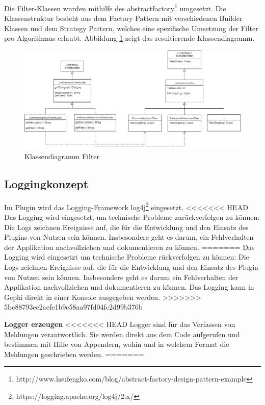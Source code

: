 Die Filter-Klassen wurden mithilfe des \acs{abstractfactory}\footnote{http://www.hsufengko.com/blog/abstract-factory-design-pattern-example} umgesetzt. Die Klassenstruktur besteht aus dem Factory Pattern mit verschiedenen Builder Klassen und dem Strategy Pattern, welches eine spezifische Umsetzung der Filter pro Algorithmus erlaubt. Abbildung \ref{fig:class_filter} zeigt das resultierende Klassendiagramm.
\begin{figure}
    \centering
    \includegraphics[width=\linewidth]{resources/class_Filter.png}
    \caption{Klassendiagramm Filter}
    \label{fig:class_filter}
\end{figure}

\subsection{Loggingkonzept}
\label{loggingkonzept}

Im Plugin wird das Logging-Framework log4j\footnote{https://logging.apache.org/log4j/2.x/} eingesetzt.
<<<<<<< HEAD
Das Logging wird eingesetzt, um technische Probleme zurückverfolgen zu können: Die Logs zeichnen Ereignisse auf, die für die Entwicklung und den Einsatz des Plugins von Nutzen sein können.
Insbesondere geht es darum, ein Fehlverhalten der Applikation nachvollziehen und dokumentieren zu können.
=======
Das Logging wird eingesetzt um technische Probleme rückverfolgen zu können: Die Logs zeichnen Ereignisse auf, die für die Entwicklung und den Einsatz des Plugin von Nutzen sein können.
Insbesondere geht es darum ein Fehlverhalten der Applikation nachvollziehen und dokumentieren zu können. Das Logging kann in Gephi direkt in einer Konsole ausgegeben werden.
>>>>>>> 5bc88793ec2aefe1b9c58aa97fd04fc2d99b376b

\newpage
\textbf{Logger erzeugen}
<<<<<<< HEAD
Logger sind für das Verfassen von Meldungen verantwortlich. Sie werden direkt aus dem Code aufgerufen und bestimmen mit Hilfe von Appendern, wohin und in welchem Format die Meldungen geschrieben werden.
=======

